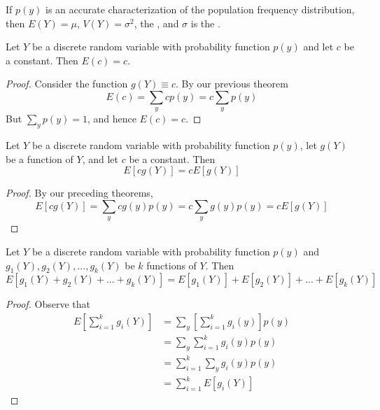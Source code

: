 \documentclass[12pt, a4paper, twoside, openright, titlepage]{book}
\begin{document}
\begin{rmk}{}{}
    If $p(y)$ is an accurate characterization of the population frequency distribution, then $E(Y) = \mu$, $V(Y) = \sigma^2$, the , and $\sigma$ is the .
\end{rmk}

\begin{thm}{}{}
    Let $Y$ be a discrete random variable with probability function $p(y)$ and let $c$ be a constant. Then $E(c) = c$.
\end{thm}
\begin{proof}{}{}
    Consider the function $g(Y) \equiv c$. By our previous theorem \begin{equation*}
        E(c) = \sum_ycp(y) = c\sum_yp(y)
    \end{equation*}
    But $\sum_yp(y) = 1$, and hence $E(c) = c$.
\end{proof}


\begin{thm}{}{}
    Let $Y$ be a discrete random variable with probability function $p(y)$, let $g(Y)$ be a function of $Y$, and let $c$ be a constant. Then \begin{equation*}
        E[cg(Y)] = cE[g(Y)]
    \end{equation*}
\end{thm}
\begin{proof}{}{}
    By our preceding theorems, \begin{equation*}
        E[cg(Y)] = \sum_ycg(y)p(y) = c\sum_yg(y)p(y) = cE[g(Y)]
    \end{equation*}
\end{proof}


\begin{thm}{}{}
    Let $Y$ be a discrete random variable with probability function $p(y)$ and $g_1(Y), g_2(Y),...,g_k(Y)$ be $k$ functions of $Y$. Then \begin{equation*}
        E[g_1(Y)+g_2(Y) + ... + g_k(Y)] = E[g_1(Y)] + E[g_2(Y)] + ... + E[g_k(Y)]
    \end{equation*}
\end{thm}
\begin{proof}{}{}
    Observe that \begin{align*}
        E\left[\sum\limits_{i=1}^kg_i(Y)\right] &= \sum\limits_y\left[\sum\limits_{i=1}^kg_i(y)\right]p(y) \\
        &=\sum\limits_y\sum\limits_{i=1}^kg_i(y)p(y) \\
        &=\sum\limits_{i=1}^k\sum\limits_yg_i(y)p(y) \\
        &= \sum\limits_{i=1}^kE[g_i(Y)]
    \end{align*}
\end{proof}
\end{document}
